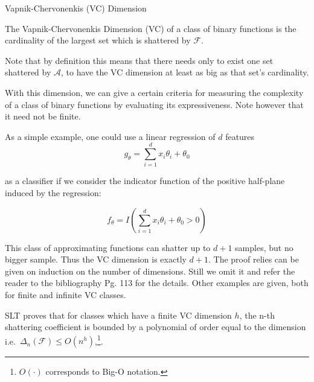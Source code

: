 \begin{appendices}
\begin{definition}{Vapnik-Chervonenkis (VC) Dimension}

The Vapnik-Chervonenkis Dimension (VC) of a class of binary functions is the cardinality of the largest set which is shattered by $\mathcal {F}$.
\end{definition}

Note that by definition this means that there needs only to exist one set shattered by $\mathcal {A}$, to have the VC dimension at least as big as that set's cardinality.

With this dimension, we can give a certain criteria for measuring the complexity of a class of binary functions by evaluating its expressiveness.
Note however that it need not be finite.

As a simple example, one could use a linear regression of $d$ features
\begin{equation}
g_{\theta} = \sum_{i=1}^d x_i \theta_i + \theta_0
\end{equation}

 as a classifier if we consider the indicator function of the positive half-plane induced by the regression:

\begin{equation}
f_{\theta} = I(\sum_{i=1}^d x_i \theta_i + \theta_0 > 0)
\end{equation}

This class of approximating functions can shatter up to $d+1$ samples, but no bigger sample.
Thus the VC dimension is exactly $d+1$.
The proof relies can be given on induction on the number of dimensions.
Still we omit it and refer the reader to the bibliography \textcite{cherkassky-learning2007} Pg.
113 for the details.
Other examples are given, both for finite and infinite VC classes.


SLT proves that for classes which have a finite VC dimension $h$, the n-th shattering coefficient is bounded by a polynomial of order equal to the dimension
i.e.\ $\Delta_n(\mathcal {F}) \leq O(n^{h})$,\footnote{$O(\cdot)$ corresponds to Big-O notation.}.



\end{appendices}

